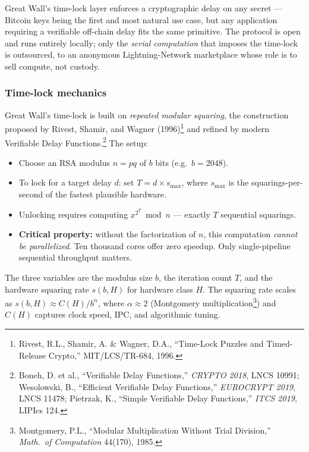 \documentclass[a4paper,11pt]{article}
\begin{document}
Great Wall's time-lock layer enforces a cryptographic delay on any secret --- Bitcoin keys being the first and most natural use case, but any application requiring a verifiable off-chain delay fits the same primitive. The protocol is open and runs entirely locally; only the \emph{serial computation} that imposes the time-lock is outsourced, to an anonymous Lightning-Network marketplace whose role is to sell compute, not custody.

\subsubsection{Time-lock mechanics}

Great Wall's time-lock is built on \textit{repeated modular squaring}, the construction proposed by Rivest, Shamir, and Wagner (1996)\footnote{Rivest, R.L., Shamir, A. \& Wagner, D.A., ``Time-Lock Puzzles and Timed-Release Crypto,'' MIT/LCS/TR-684, 1996.} and refined by modern Verifiable Delay Functions.\footnote{Boneh, D. et al., ``Verifiable Delay Functions,'' \textit{CRYPTO 2018}, LNCS 10991; Wesolowski, B., ``Efficient Verifiable Delay Functions,'' \textit{EUROCRYPT 2019}, LNCS 11478; Pietrzak, K., ``Simple Verifiable Delay Functions,'' \textit{ITCS 2019}, LIPIcs 124.} The setup:

\begin{itemize}[nosep,leftmargin=1.5em]
  \item Choose an RSA modulus $n = pq$ of $b$ bits (e.g.\ $b = 2048$).
  \item To lock for a target delay $d$: set $T = d \times s_{\max}$, where $s_{\max}$ is the squarings-per-second of the fastest plausible hardware.
  \item Unlocking requires computing $x^{2^T} \bmod n$ --- exactly $T$ sequential squarings.
  \item \textbf{Critical property:} without the factorization of $n$, this computation \textit{cannot be parallelized}. Ten thousand cores offer zero speedup. Only single-pipeline sequential throughput matters.
\end{itemize}

\noindent The three variables are the modulus size $b$, the iteration count $T$, and the hardware squaring rate $s(b, H)$ for hardware class $H$. The squaring rate scales as $s(b,H) \approx C(H) / b^\alpha$, where $\alpha \approx 2$ (Montgomery multiplication\footnote{Montgomery, P.L., ``Modular Multiplication Without Trial Division,'' \textit{Math.\ of Computation} 44(170), 1985.}) and $C(H)$ captures clock speed, IPC, and algorithmic tuning.
\end{document}

